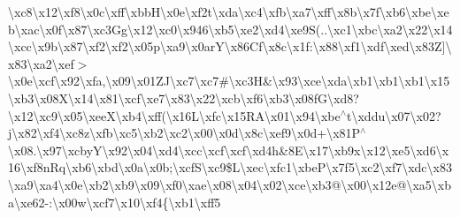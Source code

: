 \begin{DoxyCompactItemize}
\textbackslash{}xc8\textbackslash{}x12\textbackslash{}xf8\textbackslash{}x0c\textbackslash{}xff\textbackslash{}xbb\+H\textbackslash{}x0e\textbackslash{}xf2t\textbackslash{}xda\textbackslash{}xc4\textbackslash{}xfb\textbackslash{}xa7\textbackslash{}xff\textbackslash{}x8b\textbackslash{}x7f\textbackslash{}xb6\textbackslash{}xbe\textbackslash{}xeb\textbackslash{}xac\textbackslash{}x0f\textbackslash{}x87\textbackslash{}xc3\+Gg\textbackslash{}x12\textbackslash{}xc0\textbackslash{}x946\textbackslash{}xb5\textbackslash{}xe2\textbackslash{}xd4\textbackslash{}xe9\+S(..\textbackslash{}xc1\textbackslash{}xbc\textbackslash{}xa2\textbackslash{}x22\textbackslash{}x14\textbackslash{}xcc\textbackslash{}x9b\textbackslash{}x87\textbackslash{}xf2\textbackslash{}xf2\textbackslash{}x05p\textbackslash{}xa9\textbackslash{}x0ar\+Y\textbackslash{}x86\+Cf\textbackslash{}x8c\textbackslash{}x1f\+:\textbackslash{}x88\textbackslash{}xf1\textbackslash{}xdf\textbackslash{}xed\textbackslash{}x83\+Z\mbox{]}\textbackslash{}x83\textbackslash{}xa2\textbackslash{}xef$>$\textbackslash{}x0e\textbackslash{}xcf\textbackslash{}x92\textbackslash{}xfa,\textbackslash{}x09\textbackslash{}x01\+Z\+J\textbackslash{}xc7\textbackslash{}xc7\#\textbackslash{}xc3\+H\&\textbackslash{}x93\textbackslash{}xce\textbackslash{}xda\textbackslash{}xb1\textbackslash{}xb1\textbackslash{}xb1\textbackslash{}x15\textbackslash{}xb3\textbackslash{}x08\+X\textbackslash{}x14\textbackslash{}x81\textbackslash{}xcf\textbackslash{}xe7\textbackslash{}x83\textbackslash{}x22\textbackslash{}xcb\textbackslash{}xf6\textbackslash{}xb3\textbackslash{}x08f\+G\textbackslash{}xd8?\textbackslash{}x12\textbackslash{}xc9\textbackslash{}x05\textbackslash{}xee\+X\textbackslash{}xb4\textbackslash{}xff(\textbackslash{}x16\+L\textbackslash{}xfc\textbackslash{}x15\+R\+A\textbackslash{}x01\textbackslash{}x94\textbackslash{}xbe$^\wedge$t\textbackslash{}xddu\textbackslash{}x07\textbackslash{}x02?j\textbackslash{}x82\textbackslash{}xf4\textbackslash{}xc8z\textbackslash{}xfb\textbackslash{}xc5\textbackslash{}xb2\textbackslash{}xc2\textbackslash{}x00\textbackslash{}x0d\textbackslash{}x8c\textbackslash{}xef9\textbackslash{}x0d+\textquotesingle{}\textbackslash{}x81\+P$^\wedge$\textbackslash{}x08.\textbackslash{}x97\textbackslash{}xcby\+Y\textbackslash{}x92\textbackslash{}x04\textbackslash{}xd4\textbackslash{}xcc\textbackslash{}xcf\textbackslash{}xcf\textbackslash{}xd4h\&8\+E\textbackslash{}x17\textbackslash{}xb9x\textbackslash{}x12\textbackslash{}xe5\textbackslash{}xd6\textbackslash{}x16\textbackslash{}xf8n\+Rq\textbackslash{}xb6\textbackslash{}xbd\textbackslash{}x0a\textbackslash{}x0b;\textbackslash{}xcf\+S\textbackslash{}xc9\$\+L\textbackslash{}xec\textbackslash{}xfc1\textbackslash{}xbe\+P\textbackslash{}x7f5\textbackslash{}xc2\textbackslash{}xf7\textbackslash{}xdc\textbackslash{}x83\textbackslash{}xa9\textbackslash{}xa4\textbackslash{}x0e\textbackslash{}xb2\textbackslash{}xb9\textbackslash{}x09\textbackslash{}xf0\textbackslash{}xae\textbackslash{}x08\textbackslash{}x04\textbackslash{}x02\textbackslash{}xce\textbackslash{}xb3@\textbackslash{}x00\textbackslash{}x12e@\textbackslash{}xa5\textbackslash{}xba\textbackslash{}xe62-\/\+:\textbackslash{}x00w\textbackslash{}xcf7\textbackslash{}x10\textbackslash{}xf4\{\textbackslash{}xb1\textbackslash{}xff5\text
\end{DoxyCompactItemize}
